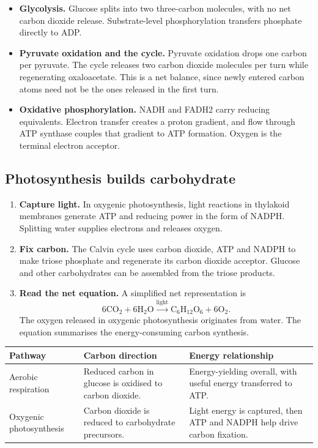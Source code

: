 \documentclass[12pt,a4paper]{article}
\begin{document}
\begin{itemize}[leftmargin=*, itemsep=2pt]
  \item \textbf{Glycolysis.} Glucose splits into two three-carbon molecules, with no net carbon dioxide release. Substrate-level phosphorylation transfers phosphate directly to ADP.
  \item \textbf{Pyruvate oxidation and the cycle.} Pyruvate oxidation drops one carbon per pyruvate. The cycle releases two carbon dioxide molecules per turn while regenerating oxaloacetate. This is a net balance, since newly entered carbon atoms need not be the ones released in the first turn.
  \item \textbf{Oxidative phosphorylation.} NADH and FADH2 carry reducing equivalents. Electron transfer creates a proton gradient, and flow through ATP synthase couples that gradient to ATP formation. Oxygen is the terminal electron acceptor.
\end{itemize}

\subsection{Photosynthesis builds carbohydrate}
\begin{enumerate}[leftmargin=*, itemsep=3pt, topsep=4pt]
  \item \textbf{Capture light.} In oxygenic photosynthesis, light reactions in thylakoid membranes generate ATP and reducing power in the form of NADPH. Splitting water supplies electrons and releases oxygen.
  \item \textbf{Fix carbon.} The Calvin cycle uses carbon dioxide, ATP and NADPH to make triose phosphate and regenerate its carbon dioxide acceptor. Glucose and other carbohydrates can be assembled from the triose products.
  \item \textbf{Read the net equation.} A simplified net representation is
 \[
 \mathrm{6CO_2+6H_2O \xrightarrow{light} C_6H_{12}O_6+6O_2}.
 \]
 The oxygen released in oxygenic photosynthesis originates from water. The equation summarises the energy-consuming carbon synthesis.
\end{enumerate}
\par\vspace{5pt}
\begingroup
\setlength{\extrarowheight}{1pt}
\noindent\begin{tabularx}{\linewidth}{|B{3.45cm}|Y|Y|}
\hline
\textbf{Pathway} & \textbf{Carbon direction} & \textbf{Energy relationship} \\ \hline
Aerobic respiration & Reduced carbon in glucose is oxidised to carbon dioxide. & Energy-yielding overall, with useful energy transferred to ATP. \\ \hline
Oxygenic photosynthesis & Carbon dioxide is reduced to carbohydrate precursors. & Light energy is captured, then ATP and NADPH help drive carbon fixation. \\ \hline
\end{tabularx}\par
\endgroup
\end{document}

